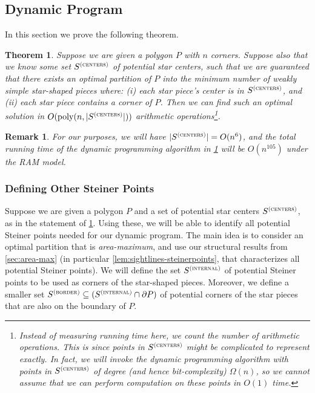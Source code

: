 \documentclass[10pt,a4paper]{article}
\newtheorem{theorem}{Theorem}[section]
\newtheorem{remark}{Remark}[section]
\newcommand\Scen{S^{\textsc{(centers)}}}
\newcommand\Sint{S^{\textsc{(internal)}}}
\newcommand\Sbor{S^{\textsc{(border)}}}
\newcommand\poly{\mathrm{poly}}
\begin{document}
\subsection{Dynamic Program} \label{sec:dp}

In this section we prove the following theorem.

\begin{theorem}
\label{thm:dp}
Suppose we are given a polygon $P$ with $n$ corners. Suppose also that we know some set $\Scen$ of potential star centers, such that we are guaranteed that there exists an optimal partition of $P$ into the minimum number of weakly simple star-shaped pieces where: (i) each star piece's center is in $\Scen$, and (ii) each star piece contains a corner of $P$.
Then we can find such an optimal solution in $O(\poly(n,|\Scen|))$ arithmetic operations\footnote{Instead of measuring running time here, we count the number of arithmetic operations. This is since points in $\Scen$ might be complicated to represent exactly. In fact, we will invoke the dynamic programming algorithm with points in $\Scen$ of \emph{degree} (and hence bit-complexity) $\Omega(n)$, so we cannot assume that we can perform computation on these points in $O(1)$ time.}.
\end{theorem}

\begin{remark}
\label{rem:dp}
For our purposes, we will have $|\Scen| = O(n^6)$, and the total running time of the dynamic programming algorithm in \cref{thm:dp} will be $O(n^{105})$ under the RAM model. 
\end{remark}

\subsubsection{Defining Other Steiner Points}
Suppose we are given a polygon $P$ and a set of potential star centers $\Scen$, as in the statement of \cref{thm:dp}. Using these, we will be able to identify all potential Steiner points needed for our dynamic program.
The main idea is to consider an optimal partition that is \emph{area-maximum}, and use our structural results from \cref{sec:area-max} (in particular \cref{lem:sightlines-steinerpoints}, that characterizes all potential Steiner points).
We will define the set $\Sint$ of potential Steiner points to be used as corners of the star-shaped pieces. Moreover, we define a smaller set $\Sbor\subseteq (\Sint\cap \partial P)$ of potential corners of the star pieces that are also on the boundary of $P$. 
\end{document}
